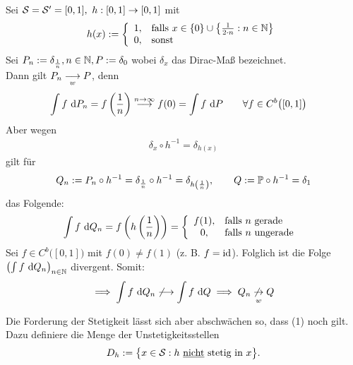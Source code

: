 \begin{beispiel} %
Sei $\S=\S'=[0,1],~h:[0,1]\to[0,1]$ mit
\begin{align*}
h(x):=\left\lbrace\begin{array}{cl}
1, &\falls x\in\lbrace 0\rbrace\cup\left\lbrace\frac{1}{2\cdot n}:n\in\N\right\rbrace\\
0, & \sonst
\end{array}\right.
\end{align*}
Sei $P_n:=\delta_{\frac{1}{n}},n\in\N,P:=\delta_{0}$ wobei $\delta_x$ das Dirac-Maß bezeichnet.\\
Dann gilt $P_n\stackrelnew{w}{}{\longrightarrow} P$, denn
\begin{align*}
\int\limits f\d P_n&=f\left(\frac{1}{n}\right)\stackrel{n\to\infty}{\longrightarrow} f(0)=\int\limits f\d P\qquad\forall f\in C^b\big([0,1]\big)
\end{align*}
Aber wegen 
\begin{align*}
\delta_x\circ h^{-1}=\delta_{h(x)}
\end{align*}
gilt für
\begin{align*}
Q_n:=P_n\circ h^{-1}=\delta_{\frac{1}{n}}\circ h^{-1}=\delta_{h\left(\frac{1}{n}\right)},\qquad Q:=\P\circ h^{-1}=\delta_1
\end{align*}
das Folgende:
\begin{align*}
\int\limits f\d Q_n=f\left(h\left(\frac{1}{n}\right)\right)=\left\lbrace\begin{array}{cl}
f(1), & \falls n\text{ gerade }\\
0, & \falls n\text{ ungerade }
\end{array}\right.
\end{align*}
Sei $f\in C^b\big([0,1]\big)$ mit $f(0)\neq f(1)$ (z. B. $f=\id$). Folglich ist die Folge $\left(\int f\d Q_n\right)_{n\in\N}$ divergent. Somit:
\begin{align*}
\implies\int\limits f\d Q_n\not\longrightarrow\int\limits f\d Q\implies Q_n\stackrelnew{w}{}{\not\to} Q
\end{align*}
\end{beispiel}

Die Forderung der Stetigkeit lässt sich aber abschwächen so, dass (1) noch gilt. Dazu definiere die Menge der Unstetigkeitsstellen
\begin{align*}
D_h:=\big\lbrace x\in\S: h\text{ \underline{nicht} stetig in }x\big\rbrace.
\end{align*}

